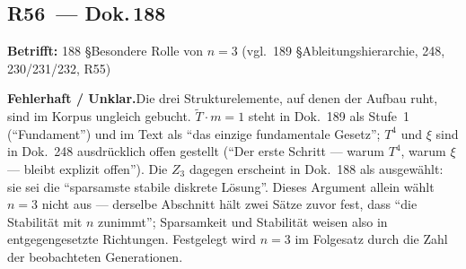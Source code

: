 \medskip


\subsection*{R56~--- Dok.\,188}

\noindent\textbf{Betrifft:} 188 \S{}Besondere Rolle von $n=3$ (vgl.\ 189 \S{}Ableitungshierarchie, 248, 230/231/232, R55)


\smallskip\noindent\textbf{Fehlerhaft / Unklar.}\quad Die drei Strukturelemente, auf denen der Aufbau ruht, sind im Korpus ungleich gebucht. $\tilde{T}\cdot m = 1$ steht in Dok.~189 als Stufe~1 (\enquote{Fundament}) und im Text als \enquote{das einzige fundamentale Gesetz}; $T^4$ und $\xi$ sind in Dok.~248 ausdrücklich offen gestellt (\enquote{Der erste Schritt --- warum $T^4$, warum $\xi$ --- bleibt explizit offen}). Die $Z_3$ dagegen erscheint in Dok.~188 als ausgewählt: sie sei die \enquote{sparsamste stabile diskrete Lösung}. Dieses Argument allein wählt $n=3$ nicht aus --- derselbe Abschnitt hält zwei Sätze zuvor fest, dass \enquote{die Stabilität mit $n$ zunimmt}; Sparsamkeit und Stabilität weisen also in entgegengesetzte Richtungen. Festgelegt wird $n=3$ im Folgesatz durch die Zahl der beobachteten Generationen.


